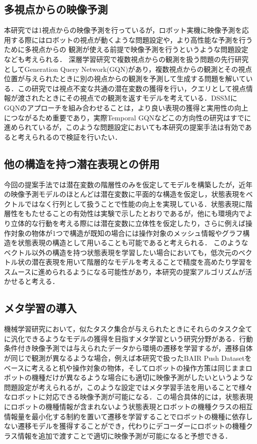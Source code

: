 \subsection{多視点からの映像予測}
本研究では1視点からの映像予測を行っているが，ロボット実機に映像予測を応用する際にはロボットの視点が動くような問題設定や，より高性能な予測を行うために多視点からの
観測が使える前提で映像予測を行うというような問題設定なども考えられる．
深層学習研究で複数視点からの観測を扱う問題の先行研究としてGeneration Query Network(GQN)\cite{eslami2018neural}があり，複数視点からの観測とその視点位置が与えられたときに別の視点からの観測を予測して生成する問題を解いている．この研究では視点不変な共通の潜在変数の獲得を行い，クエリとして視点情報が渡されたときにその視点での観測を返すモデルを考えている．DSSMにGQNのアプローチを組み合わせることは，より良い表現の獲得と実用性の向上につながるため重要であり，実際Temporal GQN\cite{singh2019sequential}などこの方向性の研究はすでに進められているが，このような問題設定においても本研究の提案手法は有効であると考えられるので検証を行いたい．

\subsection{他の構造を持つ潜在表現との併用}
今回の提案手法では潜在変数の階層性のみを仮定してモデルを構築したが，近年の映像予測モデルのほとんどは潜在変数に平面的な構造を仮定し，状態表現をベクトルではなく行列として扱うことで性能の向上を実現している\cite{denton2018stochastic}\cite{villegas2019high}\cite{castrejon2019improved}．状態表現に階層性をもたせることの有効性は実験で示したとおりであるが，他にも環境内でより立体的な行動を考える際には潜在変数に立体性を仮定したり，さらに例えば操作対象の物体が1つで構造が既知の場合には操作対象のメッシュ情報やグラフ構造を状態表現の構造として用いることも可能であると考えられる．
このようなベクトル以外の構造を持つ状態表現を学習したい場合においても，低次元のベクトル状の潜在表現を用いて階層的なモデルを考えることで精度を高めたり学習をスムースに進められるようになる可能性があり，本研究の提案アルゴリズムが活かせると考える．

\subsection{メタ学習の導入}
機械学習研究において，似たタスク集合が与えられたときにそれらのタスク全てに汎化できるようなモデルの獲得を目指すメタ学習という研究分野がある．行動条件付き映像予測では与えられたデータから環境の遷移を学習するが，遷移自体が同じで観測が異なるような場合，例えば本研究で扱ったBAIR Push Datasetをベースに考えると机や操作対象の物体，そしてロボットの操作方策は同じままロボットの機種だけが異なるような場合にも適切に映像予測がしたいというような問題設定が考えられるが，このような設定ではメタ学習手法を用いることで様々なロボットに対応できる映像予測が可能になる．この場合具体的には，状態表現にロボットの機種情報が含まれないよう状態表現とロボットの機種クラスの相互情報量を最小化する制約を置いて遷移を学習することでロボットの機種に依存しない遷移モデルを獲得することができ，代わりにデコーダーにロボットの機種クラス情報を追加で渡すことで適切に映像予測が可能になると予想できる．

